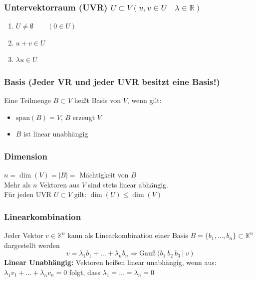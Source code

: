 \documentclass[6pt,a4paper]{scrartcl}
\newcommand{\abs}[1]{\ensuremath{\left\vert#1\right\vert}}
\begin{document}
\begin{multicols*}{4}
\subsubsection{Untervektorraum (UVR) $U\subset V (u,v\in U \quad \lambda\in\mathbb{R})$}
\begin{enumerate}\itemsep0pt
\item $U\ne \emptyset \qquad (0\in U)$
\item $u+v\in U$
\item $\lambda u \in U$
\end{enumerate}

\subsubsection{Basis (Jeder VR und jeder UVR besitzt eine Basis!)} %
\label{sub:basis}
 Eine Teilmenge $B\subset V$ heißt Basis von $V$, wenn gilt:
\begin{itemize}\itemsep0pt
	\item $\mathrm{span}(B) =V$, $B$ erzeugt $V$
	\item $B$ ist linear unabhängig
\end{itemize}    

\subsubsection{Dimension}
$n=\dim(V)=\abs{B} = $ Mächtigkeit von $B$\\
Mehr als $n$ Vektoren aus $V$ sind stets linear abhängig. \\
Für jeden UVR $U \subset V$ gilt: $\dim (U) \le \dim (V)$ 

\subsubsection{Linearkombination}
Jeder Vektor $v\in\mathbb{K}^n$ kann als Linearkombination einer Basis $B=\{b_1, \dots, b_n\} \subset \mathbb{K}^n$ dargestellt werden
\begin{equation*}
v=\lambda_1 b_1 + \dots + \lambda_n b_n \Rightarrow \text{Gauß} \ \Big(b_1 \ b_2 \ b_3 \ |\ v\ \Big)
\end{equation*}
\textbf{Linear Unabhängig:}
Vektoren heißen linear unabhängig, wenn aus: \\
$\lambda_1 v_1 + \dots + \lambda_n v_n = 0$ folgt, dass $\lambda_1 = \dots = \lambda_n = 0$


\end{multicols*}
\end{document}
